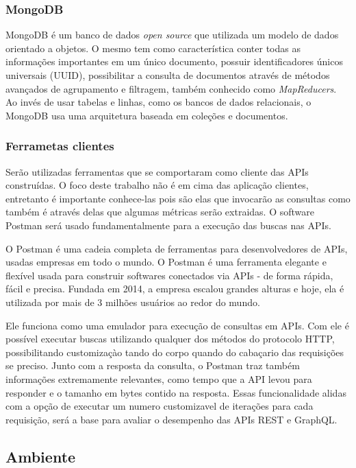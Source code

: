 \subsubsection*{MongoDB}

MongoDB é um banco de dados \textit{open source} que utilizada um modelo de dados orientado a objetos. O mesmo tem como característica conter todas as informações importantes em um único documento, possuir identificadores únicos universais (UUID), possibilitar a consulta de documentos através de métodos avançados de agrupamento e filtragem, também conhecido como \textit{MapReducers}. Ao invés de usar tabelas e linhas, como os bancos de dados relacionais, o MongoDB usa uma arquitetura baseada em coleções e documentos.


\subsubsection*{Ferrametas clientes}

Serão utilizadas ferramentas que se comportaram como cliente das APIs construídas. O foco deste trabalho não é em cima das aplicação clientes, entretanto é importante conhece-las pois são elas que invocarão as consultas como também é através delas que algumas métricas serão extraidas. O software Postman será usado fundamentalmente para a execução das buscas nas APIs.

O Postman é uma cadeia completa de ferramentas para desenvolvedores de APIs, usadas empresas em todo o mundo. O Postman é uma ferramenta elegante e flexível usada para construir softwares conectados via APIs - de forma rápida, fácil e precisa. Fundada em 2014, a empresa escalou grandes alturas e hoje, ela é utilizada por mais de 3 milhões usuários ao redor do mundo.

Ele funciona como uma emulador para execução de consultas em APIs. Com ele é possível executar buscas utilizando qualquer dos métodos do protocolo HTTP, possibilitando customizaçào tando do corpo quando do cabaçario das requisições se preciso. Junto com a resposta da consulta, o Postman traz também informações extremamente relevantes, como tempo que a API levou para responder e o tamanho em bytes contido na resposta. Essas funcionalidade alidas com a opção de executar um numero customizavel de iterações para cada requisição, será a base para avaliar o desempenho das APIs REST e GraphQL.

\subsection{Ambiente}

